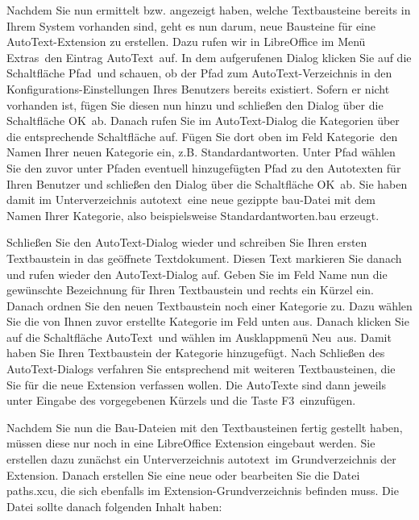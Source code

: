 \documentclass[a4paper,10pt,pagesize,titlepage]{scrbook}
\begin{document}
Nachdem Sie nun ermittelt bzw. angezeigt haben, welche Textbausteine bereits in Ihrem System vorhanden sind, geht es nun darum, neue Bausteine für eine AutoText-Extension zu erstellen. Dazu rufen wir in LibreOffice im Menü \glqq Extras\grqq~den Eintrag \glqq AutoText\grqq~auf. In dem aufgerufenen Dialog klicken Sie auf die Schaltfläche \glqq Pfad\grqq~und schauen, ob der Pfad zum AutoText-Verzeichnis in den Konfigurations-Einstellungen Ihres Benutzers bereits existiert. Sofern er nicht vorhanden ist, fügen Sie diesen nun hinzu und schließen den Dialog über die Schaltfläche \glqq OK\grqq~ab. Danach rufen Sie im AutoText-Dialog die Kategorien über die entsprechende Schaltfläche auf. Fügen Sie dort oben im Feld \glqq Kategorie\grqq~den Namen Ihrer neuen Kategorie ein, z.B. \glqq Standardantworten\grqq. Unter Pfad wählen Sie den zuvor unter Pfaden eventuell hinzugefügten Pfad zu den Autotexten für Ihren Benutzer und schließen den Dialog über die Schaltfläche \glqq OK\grqq~ab. Sie haben damit im Unterverzeichnis \glqq autotext\grqq~eine neue gezippte bau-Datei mit dem Namen Ihrer Kategorie, also beispielsweise \glqq Standardantworten.bau\grqq{} erzeugt.

Schließen Sie den AutoText-Dialog wieder und schreiben Sie Ihren ersten Textbaustein in das geöffnete Textdokument. Diesen Text markieren Sie danach und rufen wieder den AutoText-Dialog auf. Geben Sie im Feld Name nun die gewünschte Bezeichnung für Ihren Textbaustein und rechts ein Kürzel ein. Danach ordnen Sie den neuen Textbaustein noch einer Kategorie zu. Dazu wählen Sie die von Ihnen zuvor erstellte Kategorie im Feld unten aus. Danach klicken Sie auf die Schaltfläche \glqq AutoText\grqq~und wählen im Ausklappmenü \glqq Neu\grqq~aus. Damit haben Sie Ihren Textbaustein der Kategorie hinzugefügt. Nach Schließen des AutoText-Dialogs verfahren Sie entsprechend mit weiteren Textbausteinen, die Sie für die neue Extension verfassen wollen. Die AutoTexte sind dann jeweils unter Eingabe des vorgegebenen Kürzels und die Taste \glqq F3\grqq~einzufügen.

Nachdem Sie nun die Bau-Dateien mit den Textbausteinen fertig gestellt haben, müssen diese nur noch in eine LibreOffice Extension eingebaut werden. Sie erstellen dazu zunächst ein Unterverzeichnis \glqq autotext\grqq~im Grundverzeichnis der Extension. Danach erstellen Sie eine neue oder bearbeiten Sie die Datei \glqq paths.xcu\grqq, die sich ebenfalls im Extension-Grundverzeichnis befinden muss. Die Datei sollte danach folgenden Inhalt haben:
\end{document}

